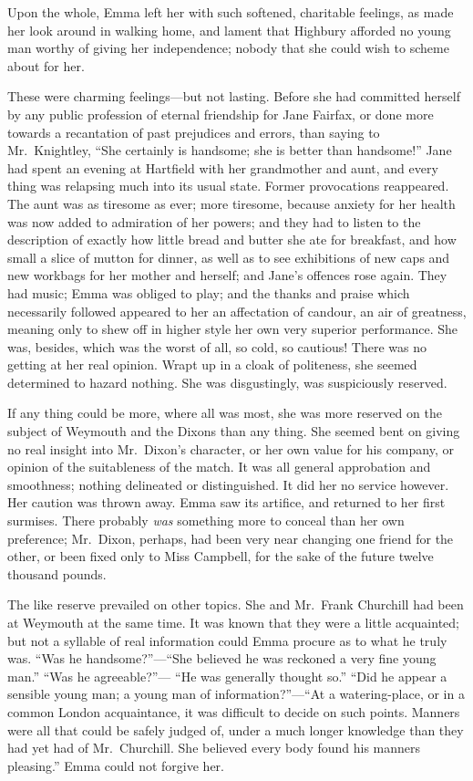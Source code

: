 Upon the whole, Emma left her with such softened, charitable feelings,
as made her look around in walking home, and lament that Highbury
afforded no young man worthy of giving her independence;
nobody that she could wish to scheme about for her.

These were charming feelings---but not lasting.  Before she had
committed herself by any public profession of eternal friendship for
Jane Fairfax, or done more towards a recantation of past prejudices
and errors, than saying to Mr.\ Knightley, ``She certainly is handsome;
she is better than handsome!''  Jane had spent an evening at Hartfield
with her grandmother and aunt, and every thing was relapsing much
into its usual state.  Former provocations reappeared.  The aunt
was as tiresome as ever; more tiresome, because anxiety for her
health was now added to admiration of her powers; and they had to
listen to the description of exactly how little bread and butter
she ate for breakfast, and how small a slice of mutton for dinner,
as well as to see exhibitions of new caps and new workbags for her
mother and herself; and Jane's offences rose again.  They had music;
Emma was obliged to play; and the thanks and praise which necessarily
followed appeared to her an affectation of candour, an air
of greatness, meaning only to shew off in higher style her own very
superior performance.  She was, besides, which was the worst of all,
so cold, so cautious!  There was no getting at her real opinion.
Wrapt up in a cloak of politeness, she seemed determined
to hazard nothing.  She was disgustingly, was suspiciously reserved.

If any thing could be more, where all was most, she was more
reserved on the subject of Weymouth and the Dixons than any thing.
She seemed bent on giving no real insight into Mr.\ Dixon's character,
or her own value for his company, or opinion of the suitableness
of the match.  It was all general approbation and smoothness;
nothing delineated or distinguished.  It did her no service however.
Her caution was thrown away.  Emma saw its artifice, and returned
to her first surmises.  There probably \emph{was} something more to conceal
than her own preference; Mr.\ Dixon, perhaps, had been very near
changing one friend for the other, or been fixed only to Miss Campbell,
for the sake of the future twelve thousand pounds.

The like reserve prevailed on other topics.  She and Mr.\ Frank Churchill
had been at Weymouth at the same time.  It was known that they were
a little acquainted; but not a syllable of real information could Emma
procure as to what he truly was.  ``Was he handsome?''---``She believed
he was reckoned a very fine young man.''  ``Was he agreeable?''---%
``He was generally thought so.''  ``Did he appear a sensible young man;
a young man of information?''---``At a watering-place, or in a common
London acquaintance, it was difficult to decide on such points.
Manners were all that could be safely judged of, under a much longer
knowledge than they had yet had of Mr.\ Churchill.  She believed
every body found his manners pleasing.''  Emma could not forgive her.



